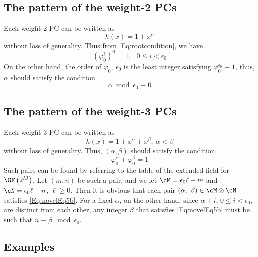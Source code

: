 \subsection{The pattern of the weight-2 PCs}
\label{sec:PC2}
Each weight-2 PC can be written as 
\begin{equation}
h(x)=1+x^{\alpha}
\label{eq:wt2-gen-form}
\end{equation}
without loss of generality. Thus from \eqref{Eq:rootcondition}, we have 
\begin{equation}
(\varphi_0^i)^{\alpha} =1,~~~ 0 \leq i < \epsilon_0
\label{novelEq5b}
\end{equation}
On the other hand, the order of $\varphi_0,~\epsilon_0$ is the least integer satisfying $\varphi_0^{\epsilon_0} \equiv 1$, thus, $\alpha$ should satisfy the condition
\begin{equation}
\alpha \bmod \epsilon_0  \equiv 0 
\label{eq:wt2-alpha}
\end{equation}

\subsection{The pattern of the weight-3 PCs}

Each weight-3 PC can be written as 
\begin{equation}
h(x)=1+x^{\alpha}+x^{\beta},~\alpha < \beta
\label{novelEqwt3}
\end{equation}
without loss of generality. 
Thus, $(\alpha,\beta)$ should satisfy the condition
\begin{equation}
\varphi_0^{\alpha}+\varphi_0^{\beta}= 1
\label{Eq:novelEq5b}
\end{equation}
Such pairs can be found by referring to the table of the extended field for $\GF\left(2^M\right)$. 
Let $(m,n)$ be such a pair, and we let $\cM=\epsilon_0 \ell+m$ and $\cN=\epsilon_0 \ell+n$, $\ell \geq 0$. Then it is obvious that each pair $(\alpha,~\beta) \in \cM \otimes \cN$ satisfies
\eqref{Eq:novelEq5b}. For a fixed $\alpha$, on the other hand, since $\alpha+i$, $0 \leq i < \epsilon_0$, are distinct from each other, any integer $\beta$ that satisfies \eqref{Eq:novelEq5b} must be such that $n\equiv \beta \mod \epsilon_0$.

\subsection{Examples}

